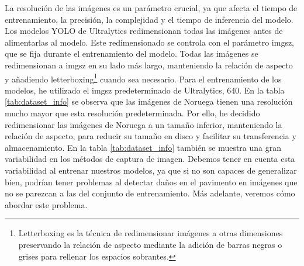 \begin{table}[H]
    \centering
    \caption{Información sobre las imágenes de los datos de la CRDDC2022.}
    \label{tab:dataset_info}
\end{table}

La resolución de las imágenes es un parámetro crucial, ya que afecta el tiempo de entrenamiento, la precisión, la complejidad y el tiempo de inferencia del modelo. Los modelos YOLO de Ultralytics redimensionan todas las imágenes antes de alimentarlas al modelo. Este redimensionado se controla con el parámetro imgsz, que se fija durante el entrenamiento del modelo. Todas las imágenes se redimensionan a imgsz en su lado más largo, manteniendo la relación de aspecto y añadiendo letterboxing\footnote{Letterboxing es la técnica de redimensionar imágenes a otras dimensiones preservando la relación de aspecto mediante la adición de barras negras o grises para rellenar los espacios sobrantes.} cuando sea necesario. Para el entrenamiento de los modelos, he utilizado el imgsz predeterminado de Ultralytics, 640. En la tabla \ref{tab:dataset_info} se observa que las imágenes de Noruega tienen una resolución mucho mayor que esta resolución predeterminada. Por ello, he decidido redimensionar las imágenes de Noruega a un tamaño inferior, manteniendo la relación de aspecto, para reducir su tamaño en disco y facilitar su transferencia y almacenamiento. En la tabla \ref{tab:dataset_info} también se muestra una gran variabilidad en los métodos de captura de imagen. Debemos tener en cuenta esta variabilidad al entrenar nuestros modelos, ya que si no son capaces de generalizar bien, podrían tener problemas al detectar daños en el pavimento en imágenes que no se parezcan a las del conjunto de entrenamiento. Más adelante, veremos cómo abordar este problema.

